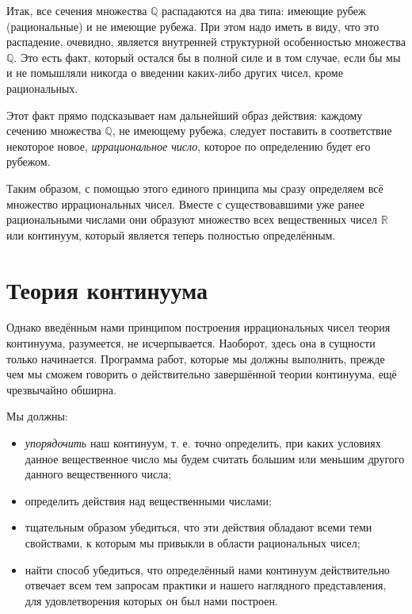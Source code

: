 \documentclass{article}
\begin{document}
Итак, все сечения множества \(\mathbb{Q}\) распадаются на два типа:
имеющие рубеж (рациональные) и не имеющие рубежа. При этом надо иметь в виду, что это распадение, очевидно, является внутренней структурной особенностью множества \(\mathbb{Q}\). Это есть факт, который остался бы в полной силе и в том случае, если бы мы и не помышляли никогда о введении каких-либо других чисел, кроме рациональных.

Этот факт прямо подсказывает нам дальнейший образ действия: каждому
сечению множества \(\mathbb{Q}\), не имеющему рубежа, следует поставить в соответствие некоторое новое, \textit{иррациональное число}, которое по определению будет его рубежом.

Таким образом, с помощью этого единого принципа мы сразу определяем всё множество иррациональных чисел. Вместе с существовавшими уже ранее рациональными числами они образуют множество всех вещественных чисел \(\mathbb{R}\) или континуум, который является теперь полностью определённым.

\section{Теория континуума}

Однако введённым нами принципом построения иррациональных чисел теория континуума, разумеется, не исчерпывается. Наоборот, здесь она в сущности только начинается. Программа работ, которые мы должны выполнить, прежде чем мы сможем говорить о действительно завершённой теории континуума, ещё чрезвычайно обширна. \newline

Мы должны:

\begin{itemize}
\item \textit{упорядочить} наш континуум, т. е. точно определить, при каких условиях данное вещественное число мы будем считать большим или меньшим другого данного вещественного числа;
\item определить действия над вещественными числами;
\item тщательным образом убедиться, что эти действия обладают всеми теми свойствами, к которым мы привыкли в области рациональных чисел;
\item найти способ убедиться, что определённый нами континуум действительно отвечает всем тем запросам практики и нашего наглядного представления, для удовлетворения которых он был нами построен.
\end{itemize}
\end{document}
